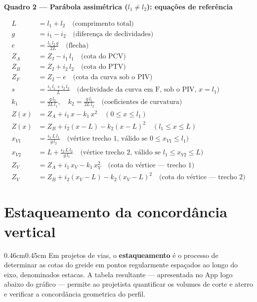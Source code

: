 \documentclass[12pt,letterpaper]{article}
\newenvironment{corpo}{\begin{adjustwidth}{0.46cm}{0.45cm}\justifying}{\end{adjustwidth}}
\begin{document}
\begin{mdframed}[style=quadrostyle,nobreak=true]
\begin{center}
  {\small\bfseries Quadro 2 — Parábola assimétrica ($l_1 \neq l_2$): equações de referência}
\end{center}
\begin{align*}
  L    &= l_1 + l_2 \quad\text{(comprimento total)}\\
  g    &= i_1 - i_2 \quad\text{(diferença de declividades)}\\
  e    &= \tfrac{l_1\,l_2\,g}{2L} \quad\text{(flecha)}\\
  Z_A  &= Z_I - i_1\,l_1 \quad\text{(cota do PCV)}\\
  Z_B  &= Z_I + i_2\,l_2 \quad\text{(cota do PTV)}\\
  Z_F  &= Z_I - e \quad\text{(cota da curva sob o PIV)}\\
  s    &= \tfrac{i_1\,l_1 + i_2\,l_2}{L} \quad\text{(declividade da curva em F, sob o PIV, $x = l_1$)}\\
  k_1  &= \tfrac{g\,l_2}{2L\,l_1},\quad k_2 = \tfrac{g\,l_1}{2L\,l_2} \quad\text{(coeficientes de curvatura)}\\
  Z(x) &= Z_A + i_1\,x - k_1\,x^2 \quad\text{$(0 \le x \le l_1)$}\\
  Z(x) &= Z_B + i_2(x-L) - k_2(x-L)^2 \quad\text{$(l_1 \le x \le L)$}\\
  x_{V1} &= \tfrac{i_1\,L\,l_1}{g\,l_2} \quad\text{(vértice trecho 1, válido se $0 \le x_{V1} \le l_1$)}\\
  x_{V2} &= L + \tfrac{i_2\,L\,l_2}{g\,l_1} \quad\text{(vértice trecho 2, válido se $l_1 \le x_{V2} \le L$)}\\
  Z_V  &= Z_A + i_1\,x_V - k_1\,x_V^2 \quad\text{(cota do vértice --- trecho 1)}\\
  Z_V  &= Z_B + i_2(x_V-L) - k_2(x_V-L)^2 \quad\text{(cota do vértice --- trecho 2)}
\end{align*}
\end{mdframed}

\section*{Estaqueamento da concordância vertical}

\begin{corpo}
Em projetos de vias, o \textbf{estaqueamento} é o processo de determinar as cotas do greide em pontos regularmente espaçados ao longo do eixo, denominados estacas. A tabela resultante — apresentada no App logo abaixo do gráfico — permite ao projetista quantificar os volumes de corte e aterro e verificar a concordância geometrica do perfil.
\end{corpo}
\end{document}
